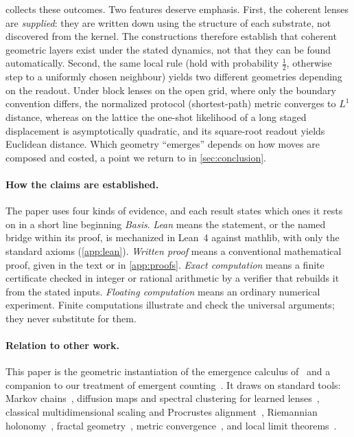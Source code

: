 \documentclass[11pt]{article}
\begin{document}
 collects these outcomes.
Two features deserve emphasis.
First, the coherent lenses are \emph{supplied}: they are written down using the structure of each substrate, not discovered from the kernel.
The constructions therefore establish that coherent geometric layers exist under the stated dynamics, not that they can be found automatically.
Second, the same local rule (hold with probability $\tfrac12$, otherwise step to a uniformly chosen neighbour) yields two different geometries depending on the readout.
Under block lenses on the open grid, where only the boundary convention differs, the normalized protocol (shortest-path) metric converges to $L^1$ distance, whereas on the lattice the one-shot likelihood of a long staged displacement is asymptotically quadratic, and its square-root readout yields Euclidean distance.
Which geometry ``emerges'' depends on how moves are composed and costed, a point we return to in \cref{sec:conclusion}.

\paragraph{How the claims are established.}
The paper uses four kinds of evidence, and each result states which ones it rests on in a short line beginning \emph{Basis}.
\emph{Lean} means the statement, or the named bridge within its proof, is mechanized in Lean~4 against mathlib, with only the standard axioms (\cref{app:lean}).
\emph{Written proof} means a conventional mathematical proof, given in the text or in \cref{app:proofs}.
\emph{Exact computation} means a finite certificate checked in integer or rational arithmetic by a verifier that rebuilds it from the stated inputs.
\emph{Floating computation} means an ordinary numerical experiment.
Finite computations illustrate and check the universal arguments; they never substitute for them.

\paragraph{Relation to other work.}
This paper is the geometric instantiation of the emergence calculus of~\cite{SixBirdsTheory} and a companion to our treatment of emergent counting~\cite{ToCountAStone}.
It draws on standard tools: Markov chains~\cite{Norris1997}, diffusion maps and spectral clustering for learned lenses~\cite{CoifmanLafon2006,vonLuxburg2007,Lloyd1982}, classical multidimensional scaling and Procrustes alignment~\cite{BorgGroenen2005,Schonemann1966}, Riemannian holonomy~\cite{Lee1997Riemannian}, fractal geometry~\cite{Falconer2003Fractal}, metric convergence~\cite{Gromov1999Metric}, and local limit theorems~\cite{Durrett2019Probability}.
\end{document}
